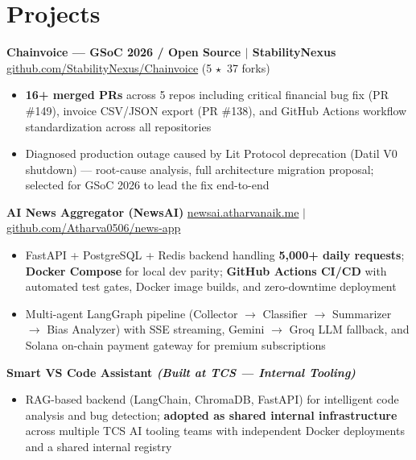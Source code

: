 \documentclass[a4paper,10pt]{article}
\newcommand{\faStar}{$\star$}
\begin{document}
\section{Projects}

\textbf{Chainvoice --- GSoC 2026 / Open Source $|$ StabilityNexus} \hfill
\href{https://github.com/StabilityNexus/Chainvoice}{github.com/StabilityNexus/Chainvoice} {\small(5 \faStar\ 37 forks)}
\begin{itemize}
\item \textbf{16+ merged PRs} across 5 repos including critical financial bug fix (PR \#149), invoice CSV/JSON export (PR \#138), and GitHub Actions workflow standardization across all repositories
\item Diagnosed production outage caused by Lit Protocol deprecation (Datil V0 shutdown) --- root-cause analysis, full architecture migration proposal; selected for GSoC 2026 to lead the fix end-to-end
\end{itemize}

\textbf{AI News Aggregator (NewsAI)} \hfill
\href{https://newsai.atharvanaik.me/}{newsai.atharvanaik.me} $|$
\href{https://github.com/Atharva0506/news-app}{github.com/Atharva0506/news-app}
\begin{itemize}
\item FastAPI + PostgreSQL + Redis backend handling \textbf{5,000+ daily requests}; \textbf{Docker Compose} for local dev parity; \textbf{GitHub Actions CI/CD} with automated test gates, Docker image builds, and zero-downtime deployment
\item Multi-agent LangGraph pipeline (Collector $\to$ Classifier $\to$ Summarizer $\to$ Bias Analyzer) with SSE streaming, Gemini $\to$ Groq LLM fallback, and Solana on-chain payment gateway for premium subscriptions
\end{itemize}

\textbf{Smart VS Code Assistant \textit{(Built at TCS --- Internal Tooling)}}
\begin{itemize}
\item RAG-based backend (LangChain, ChromaDB, FastAPI) for intelligent code analysis and bug detection; \textbf{adopted as shared internal infrastructure} across multiple TCS AI tooling teams with independent Docker deployments and a shared internal registry
\end{itemize}
\end{document}
